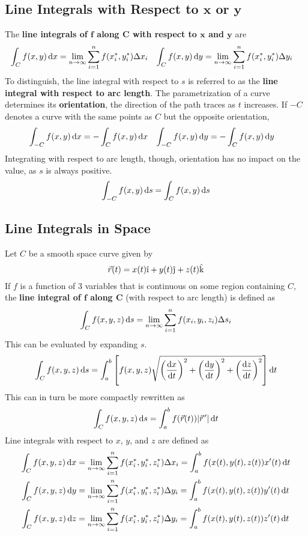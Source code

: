\documentclass[./Calculus \Roman{3}.tex]{subfiles}
\begin{document}
		\subsection*{Line Integrals with Respect to $\bm{x}$ or $\bm{y}$}
			The \textbf{line integrals of $\bm{f}$ along $\bm{C}$ with respect to $\bm{x}$ and $\bm{y}$} are 
				\begin{align*}
					\int_C f(x, y)\,\mathrm{d} x &= \lim_{n \to \infty}\sum_{i = 1}^n f(x_i^*, y_i^*)\Delta x_i &
							\int_C f(x, y)\,\mathrm{d} y &= \lim_{n \to \infty}\sum_{i = 1}^n f(x_i^*, y_i^*)\Delta y_i
				\end{align*}
				To distinguish, the line integral with respect to $s$ is referred to as the \textbf{line integral with respect to arc length}.
			The parametrization of a curve determines its \textbf{orientation}, the direction of the path traces as $t$ increases.
			If $-C$ denotes a curve with the same points as $C$ but the opposite orientation,
				\begin{align*}
					\int_{-C} f(x, y)\,\mathrm{d} x &= -\int_C f(x, y)\,\mathrm{d} x &
							\int_{-C} f(x, y)\,\mathrm{d} y &= -\int_C f(x, y)\,\mathrm{d} y
				\end{align*}
				Integrating with respect to arc length, though, orientation has no impact on the value, as $s$ is always positive.
				\[\int_{-C} f(x, y)\,\mathrm{d} s = \int_C f(x, y)\,\mathrm{d} s\]
		\subsection*{Line Integrals in Space}
			Let $C$ be a smooth space curve given by
				\[\vec{r}(t) = x(t)\vi + y(t)\vj + z(t)\vk\]
				If $f$ is a function of 3 variables that is continuous on some region containing $C$, the \textbf{line integral of $\bm{f}$ along C} (with respect to arc length) is defined as
					\[\int_C f(x, y, z)\,\mathrm{d} s = \lim_{n \to \infty}\sum_{i = 1}^n f(x_i, y_i, z_i)\Delta s_i\]
				This can be evaluated by expanding $s$.
				\[\int_C f(x, y, z)\,\mathrm{d} s = \int_a^b\left[f(x, y, z)\sqrt{\left(\frac{\mathrm{d} x}{\mathrm{d} t}\right)^2 + \left(\frac{\mathrm{d} y}{\mathrm{d} t}\right)^2 + \left(\frac{\mathrm{d} z}{\mathrm{d} t}\right)^2}\right]\mathrm{d} t\]
				This can in turn be more compactly rewritten as
				\[\int_C f(x, y, z)\,\mathrm{d} s = \int_a^b f(\vec{r}(t))|\vec{r}\hspace{0.5mm}'|\,\mathrm{d} t\]
			Line integrals with respect to $x$, $y$, and $z$ are defined as
				\begin{align*}
					\int_C f(x, y, z)\,\mathrm{d} x &= \lim_{n \to \infty}\sum_{i = 1}^n f(x_i^*, y_i^*, z_i^*)\Delta x_i
							= \int_a^b f(x(t), y(t), z(t))x'(t)\,\mathrm{d} t \\
					\int_C f(x, y, z)\,\mathrm{d} y &= \lim_{n \to \infty}\sum_{i = 1}^n f(x_i^*, y_i^*, z_i^*)\Delta y_i
							= \int_a^b f(x(t), y(t), z(t))y'(t)\,\mathrm{d} t \\
					\int_C f(x, y, z)\,\mathrm{d} z &= \lim_{n \to \infty}\sum_{i = 1}^n f(x_i^*, y_i^*, z_i^*)\Delta y_i
							= \int_a^b f(x(t), y(t), z(t))z'(t)\,\mathrm{d} t
				\end{align*}
\end{document}
